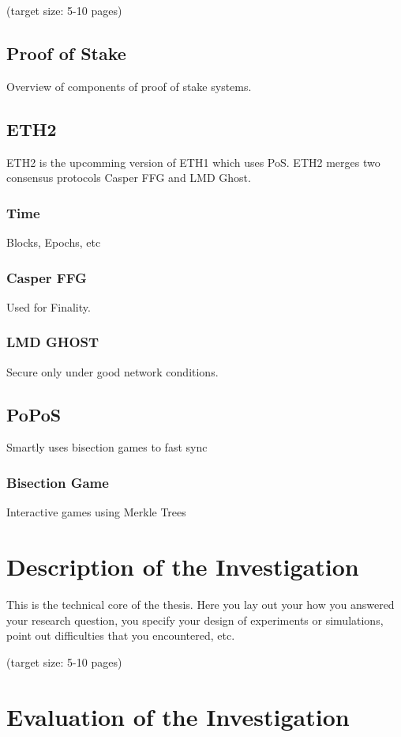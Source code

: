 \documentclass[a4paper,11pt,oneside]{article}
\begin{document}
  (target size: 5-10 pages)
  
  \subsection{Proof of Stake}
  Overview of components of proof of stake systems.
    
  \subsection{ETH2}
  ETH2 is the upcomming version of ETH1 which uses PoS. ETH2 merges two consensus protocols Casper FFG and LMD Ghost.
  \subsubsection{Time}
  Blocks, Epochs, etc
  \subsubsection{Casper FFG}
  Used for Finality. \cite{CasperFFG}
    
  \subsubsection{LMD GHOST}
  Secure only under good network conditions. \cite{Gasper}
    
  \subsection{PoPoS}
  Smartly uses bisection games to fast sync \cite{PoPos}
    
  \subsubsection{Bisection Game}
  Interactive games using Merkle Trees

  \section{Description of the Investigation}

  This is the technical core of the thesis. Here you lay out your how
  you answered your research question, you specify your design of
  experiments or simulations, point out difficulties that you
  encountered, etc.

  (target size: 5-10 pages)

  \section{Evaluation of the Investigation}
\end{document}
